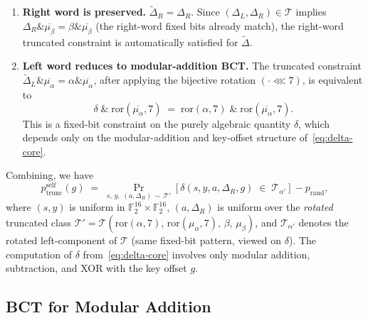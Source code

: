 \documentclass[runningheads]{llncs}
\newcommand{\pself}{p^{\mathrm{self}}_{\mathrm{trunc}}}
\newcommand{\rol}[2]{(#1 \lll #2)}
\begin{document}
\begin{enumerate}
  \item \textbf{Right word is preserved.}
    $\widetilde\Delta_R = \Delta_R$.  Since $(\Delta_L, \Delta_R) \in
    \mathcal{T}$ implies $\Delta_R \mathbin{\&} \overline{\mu_\beta} =
    \beta \mathbin{\&} \overline{\mu_\beta}$ (the right-word fixed bits
    already match), the right-word truncated constraint is automatically
    satisfied for $\widetilde\Delta$.

  \item \textbf{Left word reduces to modular-addition BCT.}
    The truncated constraint $\widetilde\Delta_L \mathbin{\&}
    \overline{\mu_\alpha} = \alpha \mathbin{\&} \overline{\mu_\alpha}$,
    after applying the bijective rotation $\rol{\cdot}{7}$, is equivalent
    to
    \[
      \delta \;\mathbin{\&}\; \text{ror}(\overline{\mu_\alpha}, 7)
      \;=\;
      \text{ror}(\alpha, 7) \;\mathbin{\&}\; \text{ror}(\overline{\mu_\alpha}, 7).
    \]
    This is a fixed-bit constraint on the purely algebraic
    quantity $\delta$, which depends only on the modular-addition and
    key-offset structure of~\eqref{eq:delta-core}.
\end{enumerate}

Combining, we have
\begin{equation}
  \label{eq:pself-mod}
  \pself(g)
  \;=\;
  \Pr_{s,\, y,\; (a,\Delta_R) \,\sim\, \mathcal{T}'}\!\left[
    \delta(s, y, a, \Delta_R, g)
    \;\in\; \mathcal{T}_{\alpha'}
  \right] - p_{\mathrm{rand}},
\end{equation}
where $(s, y)$ is uniform in $\mathbb{F}_2^{16} \times \mathbb{F}_2^{16}$,
$(a, \Delta_R)$ is uniform over the \emph{rotated} truncated class
$\mathcal{T}' = \mathcal{T}(\text{ror}(\alpha,7),\,\text{ror}(\mu_\alpha,7),\,
\beta,\, \mu_\beta)$, and $\mathcal{T}_{\alpha'}$ denotes the rotated
left-component of $\mathcal{T}$ (same fixed-bit pattern, viewed on $\delta$).
The computation of $\delta$ from~\eqref{eq:delta-core} involves only
modular addition, subtraction, and XOR with the key offset $g$.

\subsection{BCT for Modular Addition}
\label{subsec:bct-add}
\end{document}

